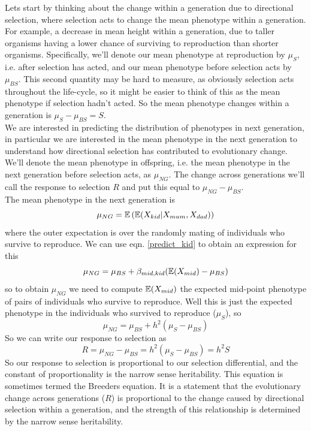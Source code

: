Lets start by thinking about the change within a generation due
to directional selection, where selection acts to change the mean
phenotype within a generation. For example, a decrease in mean height within a
generation, due to taller organisms having a lower chance of surviving
to reproduction than shorter organisms. Specifically, we'll denote our mean phenotype at
reproduction by $\mu_S$, i.e. after selection has acted, and our mean
phenotype before selection acts by $\mu_{BS}$. This second quantity may be hard to
measure, as obviously selection acts throughout the life-cycle, so it
might be easier to think of this as the mean phenotype if selection
hadn't acted. So the mean phenotype changes within a generation is $\mu_{S} - \mu_{BS}= S$.  \\

We are interested in predicting the distribution of phenotypes in next
generation, in particular we are interested in the mean phenotype in
the next generation to understand how directional selection has
contributed to evolutionary change. We'll denote the mean phenotype in
offspring, i.e. the mean phenotype in the next generation before selection acts,
as $\mu_{NG}$. The change across generations we'll call the response
to selection $R$ and put this equal to $\mu_{NG}- \mu_{BS}$. \\

The mean phenotype in the next generation is
\begin{equation}
\mu_{NG} = \mathbb{E} \left( \mathbb{E}(X_{kid} | X_{mum},X_{dad}) \right)
\end{equation}
where the outer expectation is over the randomly mating of individuals
who survive to reproduce. We can use eqn. \ref{predict_kid} to obtain
an expression for this
\begin{equation}
\mu_{NG} = \mu_{BS} +
\beta_{mid,kid} ( \mathbb{E}(X_{mid}) - \mu_{BS})
\end{equation}
so to obtain $\mu_{NG}$ we need to compute $\mathbb{E}(X_{mid})$ the expected
mid-point phenotype of pairs of individuals who survive to
reproduce. Well this is just the expected phenotype in the individuals
who survived to reproduce ($\mu_{S}$), so
\begin{equation}
\mu_{NG} = \mu_{BS} +
h^2 (\mu_S - \mu_{BS})
\end{equation}
So we can write our response to selection as
\begin{equation}
R = \mu_{NG} -\mu_{BS}  =
h^2 (\mu_S - \mu_{BS}) = h^2 S \label{breeders_eqn}
\end{equation}
So our response to selection is proportional to our selection
differential, and the constant of proportionality is the narrow sense
heritability. This equation is sometimes termed the Breeders
equation. It is a statement that the evolutionary change across
generations ($R$) is proportional to the change caused by directional selection
within a generation, and the strength of this relationship is
determined by the narrow sense heritability. \\

